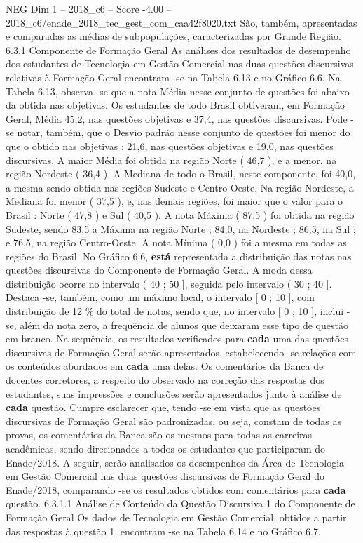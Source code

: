\begin{textsample}{NEG Dim 1 – 2018\_c6 – Score -4.00 – 2018\_c6/enade\_2018\_tec\_gest\_com\_caa42f8020.txt}
São, também, apresentadas e comparadas as médias de subpopulações, caracterizadas por Grande Região. 6.3.1 Componente de Formação Geral As análises dos resultados de desempenho dos estudantes de Tecnologia em Gestão Comercial nas duas questões discursivas relativas à Formação Geral encontram -se na Tabela 6.13 e no Gráfico 6.6.
Na Tabela 6.13, observa -se que a nota Média nesse conjunto de questões foi abaixo da obtida nas objetivas.
Os estudantes de todo Brasil obtiveram, em Formação Geral, Média 45,2, nas questões objetivas e 37,4, nas questões discursivas.
Pode -se notar, também, que o Desvio padrão nesse conjunto de questões foi menor do que o obtido nas objetivas : 21,6, nas questões objetivas e 19,0, nas questões discursivas.
A maior Média foi obtida na região Norte ( 46,7 ), e a menor, na região Nordeste ( 36,4 ).
A Mediana de todo o Brasil, neste componente, foi 40,0, a mesma sendo obtida nas regiões Sudeste e Centro-Oeste.
Na região Nordeste, a Mediana foi menor ( 37,5 ), e, nas demais regiões, foi maior que o valor para o Brasil : Norte ( 47,8 ) e Sul ( 40,5 ).
A nota Máxima ( 87,5 ) foi obtida na região Sudeste, sendo 83,5 a Máxima na região Norte ; 84,0, na Nordeste ; 86,5, na Sul ; e 76,5, na região Centro-Oeste.
A nota Mínima ( 0,0 ) foi a mesma em todas as regiões do Brasil.
No Gráfico 6.6, \textbf{está} representada a distribuição das notas nas questões discursivas do Componente de Formação Geral.
A moda dessa distribuição ocorre no intervalo ( 40 ; 50 ], seguida pelo intervalo ( 30 ; 40 ].
Destaca -se, também, como um máximo local, o intervalo [ 0 ; 10 ], com distribuição de 12 \% do total de notas, sendo que, no intervalo [ 0 ; 10 ], inclui -se, além da nota zero, a frequência de alunos que deixaram esse tipo de questão em branco.
Na sequência, os resultados verificados para \textbf{cada} uma das questões discursivas de Formação Geral serão apresentados, estabelecendo -se relações com os conteúdos abordados em \textbf{cada} uma delas.
Os comentários da Banca de docentes corretores, a respeito do observado na correção das respostas dos estudantes, suas impressões e conclusões serão apresentados junto à análise de \textbf{cada} questão.
Cumpre esclarecer que, tendo -se em vista que as questões discursivas de Formação Geral são padronizadas, ou seja, constam de todas as provas, os comentários da Banca são os mesmos para todas as carreiras acadêmicas, sendo direcionados a todos os estudantes que participaram do Enade/2018.
A seguir, serão analisados os desempenhos da Área de Tecnologia em Gestão Comercial nas duas questões discursivas de Formação Geral do Enade/2018, comparando -se os resultados obtidos com comentários para \textbf{cada} questão. 6.3.1.1 Análise de Conteúdo da Questão Discursiva 1 do Componente de Formação Geral Os dados de Tecnologia em Gestão Comercial, obtidos a partir das respostas à questão 1, encontram -se na Tabela 6.14 e no Gráfico 6.7.

\end{textsample}

